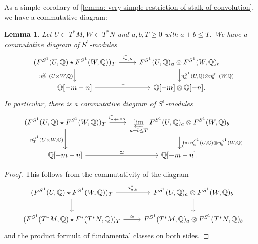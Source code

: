 \documentclass[11pt]{amsart}
\numberwithin{equation}{section}
\theoremstyle{plain}
\newtheorem{Lemma}[lemma]{Lemma}
\theoremstyle{definition}
\theoremstyle{remark}
\newcommand{\bQ} { {\mathbb{Q}}}
\begin{document}
As a simple corollary of \autoref{lemma: very simple restriction of stalk of convolution}, we have a commutative diagram:
\begin{Lemma}\label{lemma: fundamental class product decomposition naive form}Let $U \subset T^*M,W \subset T^*N$ and $a,b,T \geq 0$ with $a+b\leq T$. We have a 
commutative diagram of $S^1$-modules
\[\begin{tikzcd}
{(F^{S^1}(U,\bQ)\star F^{S^1}(W,\bQ))_{T}} \arrow[d, "{\eta^{S^1}_T(U\times W,\bQ)}" left] \arrow[r, "i_{a,b}^*"] & {F^{S^1}(U,\bQ)_{a}\otimes F^{S^1}(W,\bQ)_{b}} \arrow[d, "{\eta^{S^1}_a(U,\bQ)\otimes \eta^{S^1}_b(W,\bQ)}"] \\
{\bQ[-m-n]} \arrow[r,"{\simeq}"]  & {\bQ[-m] \otimes \bQ[-n].}
\end{tikzcd}\]
In particular, there is a commutative diagram of $S^1$-modules
\[\begin{tikzcd}
{(F^{S^1}(U,\bQ)\star F^{S^1}(W,\bQ))_{T}} \arrow[d, "{\eta^{S^1}_T(U\times W,\bQ)}" left] \arrow[r,"i_{a+b\leq T}^*"] & {\displaystyle\varprojlim_{a+b\leq T}F^{S^1}(U,\bQ)_{a}\otimes F^{S^1}(W,\bQ)_{b}} \arrow[d, "{\varprojlim \eta^{S^1}_a(U,\bQ)\otimes \eta^{S^1}_b(W,\bQ)}"] \\
{\bQ[-m-n]} \arrow[r,"{\simeq}"]  & {\bQ[-m-n].}
\end{tikzcd}\]
\end{Lemma}
\begin{proof}
This follows from the commutativity of the diagram
\[\begin{tikzcd}
{(F^{S^1}(U,\bQ)\star F^{S^1}(W,\bQ))_{T}} \arrow[d] \arrow[r, "i_{a,b}^*"] & {F^{S^1}(U,\bQ)_{a}\otimes F^{S^1}(W,\bQ)_{b}} \arrow[d] \\
{(F^{S^1}(T^*M,\bQ) \star F^*(T^*N, \bQ))_T} \arrow[r,"{\simeq}"]  & {F^{S^1}(T^*M, \bQ)_a \otimes F^{S^1}(T^*N, \bQ)_b}
\end{tikzcd}\]
and the product formula of fundamental classes on both sides.
\end{proof}
\end{document}
